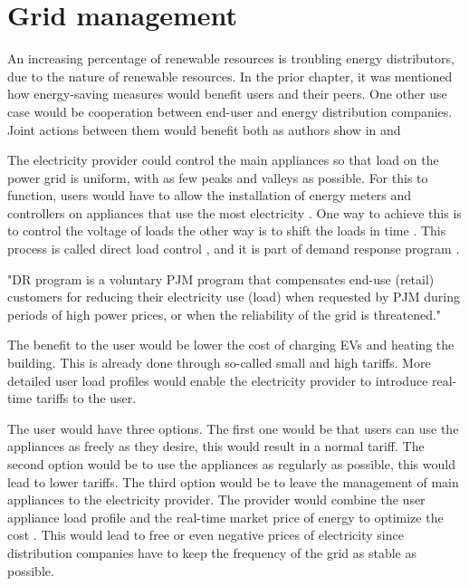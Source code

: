 \section{Grid management}

An increasing percentage of renewable resources is troubling energy distributors, due to the nature of renewable resources.
In the prior chapter, it was mentioned how energy-saving measures would benefit users and their peers.
One other use case would be cooperation between end-user and energy distribution companies.
Joint actions between them would benefit both as authors show in \cite{cooperation2008} and \cite{cooperation2010}

The electricity provider could control the main appliances so that load on the power grid is uniform,
with as few peaks and valleys as possible. For this to function, users would have to allow the installation of energy meters and controllers 
on appliances that use the most electricity \cite{gridDirectControll2015}. One way to achieve this is to control the voltage of loads \cite{controll2014} the other
way is to shift the loads in time \cite{shift2015}.
This process is called direct load control \cite{DirectLoadControll2021}, and it is part of demand response program \cite{DemandResponse2018}.

"DR program is a voluntary PJM program that compensates end-use (retail) customers for reducing their electricity use (load)
when requested by PJM during periods of high power prices, or when the reliability of the grid is threatened." \cite{DemandResponse2018}

The benefit to the user would be lower the cost of charging EVs and heating the building.
This is already done through so-called small and high tariffs.
More detailed user load profiles would enable the electricity provider to introduce real-time tariffs to the user.

The user would have three options. The first one would be that users can use the appliances as freely as they desire, this would result in a normal tariff.
The second option would be to use the appliances as regularly as possible, this would lead to lower tariffs.
The third option would be to leave the management of main appliances to the electricity provider.
The provider would combine the user appliance load profile and the real-time market price of energy to optimize the cost \cite{optimiseCostShift2015}.
This would lead to free or even negative prices of electricity since distribution companies have to keep the frequency of the grid as stable as possible.

